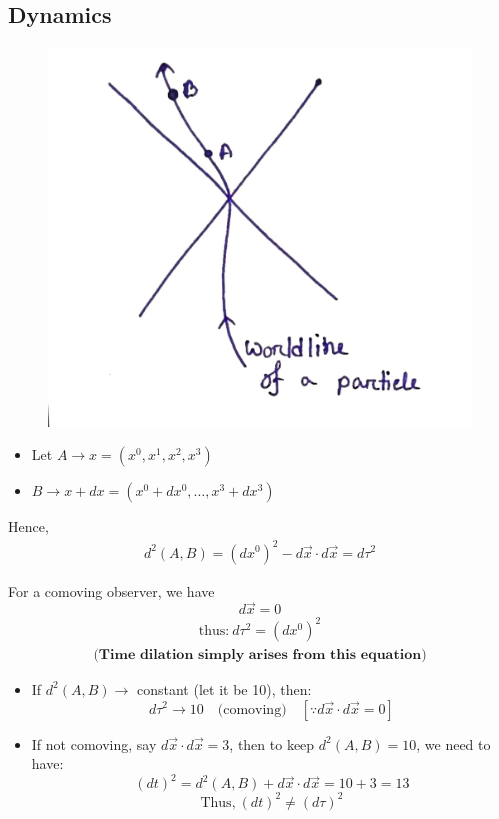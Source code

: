 \documentclass[14pt]{article} %
\begin{document}
\subsection*{Dynamics}
\begin{figure}[H]
\centering
\includegraphics[width=0.5\linewidth]{L(-1)_5.jpg}
\caption*{}
\end{figure}
\vspace{-1cm}
\begin{itemize}
    \item Let $A \to x = (x^0, x^1, x^2, x^3)$
    \item $B \to x + dx = (x^0 + dx^0, \ldots, x^3 + dx^3)$
\end{itemize}
Hence,
\begin{align*}
d^2(A,B) = (dx^0)^2 - d\vec{x} \cdot d\vec{x} = d\tau^2
\end{align*}

For a comoving observer, we have $$d\vec{x} = 0$$
\begin{align*}
\text{thus:}~ d\tau^2 = (dx^0)^2
\end{align*}
\begin{align*}
\textbf{(Time dilation simply arises from this equation)}
\end{align*}
\begin{itemize}
    \item If $d^2(A,B) \to$ constant (let it be 10), then:
    $$d\tau^2 \to 10 \quad \text{(comoving)} \quad [\because d\vec{x} \cdot d\vec{x} = 0] $$
    
    \item If not comoving, say $d\vec{x} \cdot d\vec{x} = 3$, then to keep $d^2(A,B) = 10$, we need to have:
     $$(dt)^2 = d^2(A,B) + d\vec{x} \cdot d\vec{x} = 10 + 3 = 13$$ 
    $$\text{Thus,}~ \boxed{(dt)^2 \neq (d\tau)^2 }$$
\end{itemize}
\end{document}
